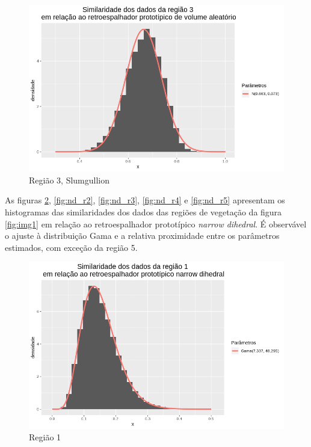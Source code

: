 \documentclass[12pt]{article}
\begin{document}
\begin{figure}[!h]
    \centering
    \vspace{0.1\linewidth}
    \includegraphics[width = \linewidth]{../../Images/Report_18_12_20/slum_rv_region3.png}
    \caption{Região 3, Slumgullion}
    \label{fig:slum_rv_r3}
\end{figure}
\newpage

As figuras \ref{fig:nd_r1}, \ref{fig:nd_r2}, \ref{fig:nd_r3}, \ref{fig:nd_r4} e \ref{fig:nd_r5} apresentam os histogramas das similaridades dos dados das regiões de vegetação da figura \ref{fig:img1} em relação ao retroespalhador prototípico \textit{narrow dihedral}. É observável o ajuste à distribuição Gama e a relativa proximidade entre os parâmetros estimados, com exceção da região 5.

\begin{figure}[!h]
    \centering
    \includegraphics[width = \linewidth]{../../Images/Report_18_12_20/nd_region1.png}
    \caption{Região 1}
    \label{fig:nd_r1}
\end{figure}
\end{document}
